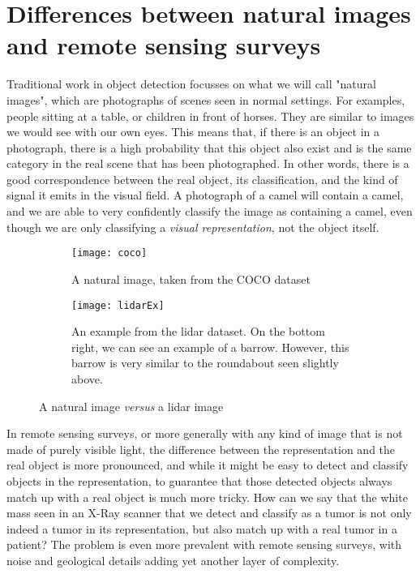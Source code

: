 
\section{Differences between natural images and remote sensing surveys}\label{diffLidarNat}
Traditional work in object detection focusses on what we will call "natural images", which are photographs of scenes seen in normal settings. For examples, people sitting at a table, or children in front of horses. They are similar to images we would see with our own eyes. This means that, if there is an object in a photograph, there is a high probability that this object also exist and is the same category in the real scene that has been photographed. In other words, there is a good correspondence between the real object, its classification, and the kind of signal it emits in the visual field. A photograph of a camel will contain a camel, and we are able to very confidently classify the image as containing a camel, even though we are only classifying a \textit{visual representation}, not the object itself.

\begin{figure}[h]
	\begin{subfigure}[t]{.5\textwidth}
  \centering
  \texttt{[image: coco]}  
	\caption{A natural image, taken from the COCO\cite{msCOCO} dataset}
  \label{fig:cocoEx}
\end{subfigure}
	\begin{subfigure}[t]{.5\textwidth}
  \centering
  \texttt{[image: lidarEx]}  
		\caption{An example from the \gls{lidar} dataset. On the bottom right, we can see an example of a barrow. However, this barrow is very similar to the roundabout seen slightly above.}
  \label{fig:lidarEx}
\end{subfigure}
	\caption{A natural image \textit{versus} a \gls{lidar} image}
\label{fig:cocovslidar}
\end{figure}

In remote sensing surveys, or more generally with any kind of image that is not made of purely visible light, the difference between the representation and the real object is more pronounced, and while it might be easy to detect and classify objects in the representation, to guarantee that those detected objects always match up with a real object is much more tricky. How can we say that the white mass seen in an X-Ray scanner that we detect and classify as a tumor is not only indeed a tumor in its representation, but also match up with a real tumor in a patient? The problem is even more prevalent with remote sensing surveys, with noise and geological details adding yet another layer of complexity.

